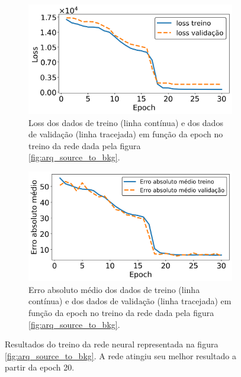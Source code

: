 \documentclass[a4paper,12pt,oneside]{book}
\begin{document}
\begin{figure}[H]
\centering
    \begin{subfigure}[t]{\textwidth}
        \centering
        \includegraphics[scale=0.51]{figs/source_to_bkg_loss.png}
        \caption{Loss dos dados de treino (linha contínua) e dos dados de validação (linha tracejada) em função da epoch no treino da rede dada pela figura \ref{fig:arq_source_to_bkg}.}
        \label{subfig:source_to_bkg_loss}
    \end{subfigure}%
    \vfill
    \begin{subfigure}[t]{\textwidth}
        \centering
        \includegraphics[scale=0.51]{figs/source_to_bkg_metric.png}
        \caption{Erro absoluto médio dos dados de treino (linha contínua) e dos dados de validação (linha tracejada) em função da epoch no treino da rede dada pela figura \ref{fig:arq_source_to_bkg}.}
        \label{subfig:source_to_bkg_metric}
    \end{subfigure}
\caption{Resultados do treino da rede neural representada na figura \ref{fig:arq_source_to_bkg}. A rede atingiu seu melhor resultado a partir da epoch 20.}
\label{fig:source_to_bkg_results}
\end{figure}
\end{document}
